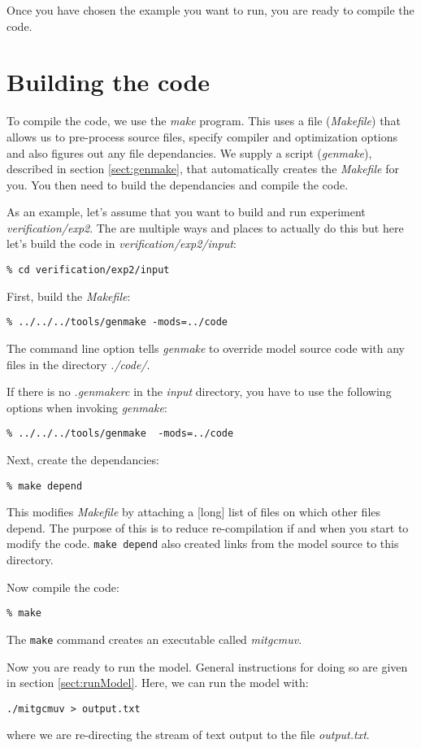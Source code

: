 Once you have chosen the example you want to run, you are ready to compile
the code.

\section{Building the code}
\label{sect:buildingCode}

To compile the code, we use the {\em make} program. This uses a file
({\em Makefile}) that allows us to pre-process source files, specify
compiler and optimization options and also figures out any file
dependancies. We supply a script ({\em genmake}), described in section
\ref{sect:genmake}, that automatically creates the {\em Makefile} for
you. You then need to build the dependancies and compile the code.

As an example, let's assume that you want to build and run experiment
\textit{verification/exp2}. The are multiple ways and places to actually
do this but here let's build the code in
\textit{verification/exp2/input}:
\begin{verbatim}
% cd verification/exp2/input
\end{verbatim}
First, build the {\em Makefile}:
\begin{verbatim}
% ../../../tools/genmake -mods=../code
\end{verbatim}
The command line option tells {\em genmake} to override model source
code with any files in the directory {\em ./code/}.

If there is no \textit{.genmakerc} in the \textit{input} directory, you have
to use the following options when invoking \textit{genmake}:
\begin{verbatim}
% ../../../tools/genmake  -mods=../code
\end{verbatim}

Next, create the dependancies:
\begin{verbatim}
% make depend
\end{verbatim}
This modifies {\em Makefile} by attaching a [long] list of files on
which other files depend. The purpose of this is to reduce
re-compilation if and when you start to modify the code. {\tt make
depend} also created links from the model source to this directory.

Now compile the code:
\begin{verbatim}
% make
\end{verbatim}
The {\tt make} command creates an executable called \textit{mitgcmuv}.

Now you are ready to run the model. General instructions for doing so are
given in section \ref{sect:runModel}. Here, we can run the model with:
\begin{verbatim}
./mitgcmuv > output.txt
\end{verbatim}
where we are re-directing the stream of text output to the file {\em
output.txt}.


